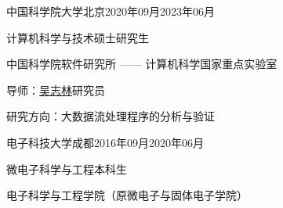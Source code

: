 
\begin{eduitem}{中国科学院大学}{北京}{2020年09月}{2023年06月}
    \item 计算机科学与技术硕士研究生
    \item 中国科学院软件研究所 —— 计算机科学国家重点实验室
    \item 导师：\href{http://lcs.ios.ac.cn/~wuzl/}{吴志林}研究员
    \item 研究方向：大数据流处理程序的分析与验证
\end{eduitem}

\begin{eduitem}{电子科技大学}{成都}{2016年09月}{2020年06月}
\item 微电子科学与工程本科生
\item 电子科学与工程学院（原微电子与固体电子学院）
\end{eduitem}



\endinput